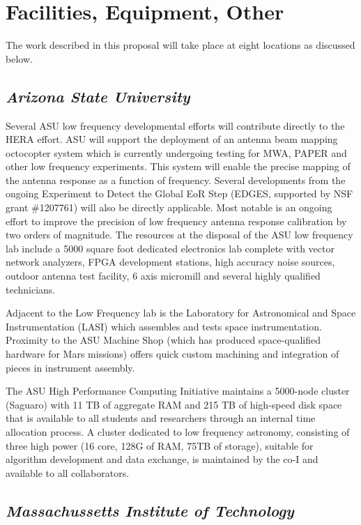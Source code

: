 \documentclass[11pt]{article}
\begin{document}
\pagestyle{empty}

\section*{Facilities, Equipment, Other}

The work described in this proposal will take place at eight locations as discussed below. 

\subsection*{\it Arizona State University}

Several ASU low frequency developmental efforts will contribute directly to the HERA effort. ASU will support the deployment of an antenna beam mapping octocopter system which is currently undergoing testing for MWA, PAPER and other low frequency experiments. This system will enable the precise mapping of the antenna response as a function of frequency. Several developments from the ongoing Experiment to Detect the Global EoR Step (EDGES, supported by NSF grant \#1207761) will also be directly applicable.  Most notable is an ongoing effort to improve the precision of low frequency antenna response calibration by two orders of magnitude. The resources at the disposal of the ASU low frequency lab include a 5000 square foot dedicated electronics lab complete with vector network analyzers, FPGA development stations, high accuracy noise sources, outdoor antenna test facility, 6 axis micromill and several highly qualified technicians.

Adjacent to the Low Frequency lab is the Laboratory for Astronomical and Space Instrumentation (LASI) which assembles and tests space instrumentation. Proximity to the ASU Machine Shop (which has produced space-qualified hardware for Mars missions) offers quick custom machining and integration of pieces in instrument assembly. 

The ASU High Performance Computing Initiative maintains a 5000-node cluster (Saguaro) with 11 TB of aggregate RAM and 215 TB of high-speed disk space that is available to all students and researchers through an internal time allocation process. A cluster dedicated to low frequency astronomy, consisting of three high power (16 core, 128G of RAM, 75TB of storage), suitable for algorithm development and data exchange, is maintained by the co-I and available to all collaborators.

\subsection*{\it Massachussetts Institute of Technology}
\end{document}
